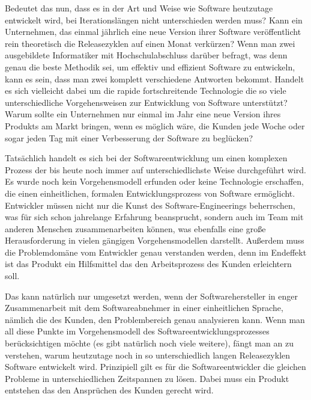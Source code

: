 Bedeutet das nun, dass es in der Art und Weise wie Software heutzutage entwickelt wird, bei Iterationslängen nicht unterschieden werden muss? Kann ein Unternehmen, das einmal jährlich eine neue Version ihrer Software veröffentlicht rein theoretisch die Releasezyklen auf einen Monat verkürzen? Wenn man zwei ausgebildete Informatiker mit Hochschulabschluss darüber befragt, was denn genau die beste Methodik sei, um effektiv und effizient Software zu entwickeln, kann es sein, dass man zwei komplett verschiedene Antworten bekommt. Handelt es sich vielleicht dabei um die rapide fortschreitende Technologie die so viele unterschiedliche Vorgehensweisen zur Entwicklung von Software unterstützt? Warum sollte ein Unternehmen nur einmal im Jahr eine neue Version ihres Produkts am Markt bringen, wenn es möglich wäre, die Kunden jede Woche oder sogar jeden Tag mit einer Verbesserung  der Software zu beglücken? 

Tatsächlich handelt es sich bei der Softwareentwicklung um einen komplexen Prozess der bis heute noch immer auf unterschiedlichste Weise durchgeführt wird. Es wurde noch kein Vorgehensmodell erfunden oder keine Technologie erschaffen, die einen einheitlichen, formalen Entwicklungsprozess von Software ermöglicht. Entwickler müssen nicht nur die Kunst des Software-Engineerings beherrschen, was für sich schon jahrelange Erfahrung beansprucht, sondern auch im Team mit anderen Menschen zusammenarbeiten können, was ebenfalls eine große Herausforderung in vielen gängigen Vorgehensmodellen darstellt. Außerdem muss die Problemdomäne vom Entwickler genau verstanden werden, denn im Endeffekt ist das Produkt ein Hilfsmittel das den Arbeitsprozess des Kunden erleichtern soll. 

Das kann natürlich nur umgesetzt werden, wenn der Softwarehersteller in enger Zusammenarbeit mit dem Softwareabnehmer in einer einheitlichen Sprache, nämlich die des Kunden, den Problembereich genau analysieren kann. Wenn man all diese Punkte im Vorgehensmodell des Softwareentwicklungsprozesses berücksichtigen möchte (es gibt natürlich noch viele weitere), fängt man an zu verstehen, warum heutzutage noch in so unterschiedlich langen Releasezyklen Software entwickelt wird. Prinzipiell gilt es für die Softwareentwickler die gleichen Probleme in unterschiedlichen Zeitspannen zu lösen. Dabei muss ein Produkt entstehen das den Ansprüchen des Kunden gerecht wird. 

